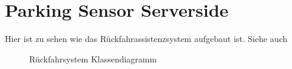 \documentclass[entwurf.tex]{subfiles}
\begin{document}
  	\section{Parking Sensor Serverside}
		Hier ist zu sehen wie das Rückfahrassistenzsystem aufgebaut ist. Siehe auch %
		\begin{figure}[H]
  			\caption{Rückfahrsystem Klassendiagramm}
  		\end{figure}
  		
  	\newpage
\end{document}
